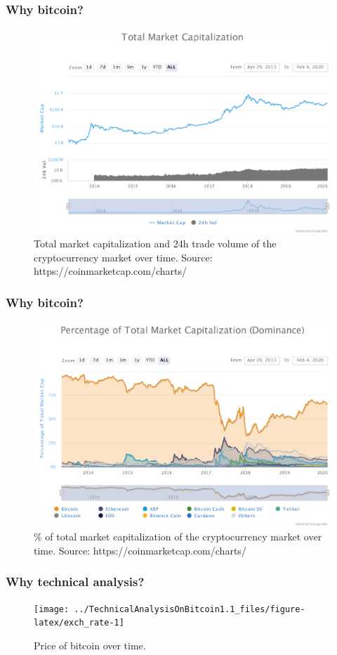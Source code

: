\documentclass[aspectratio=169]{beamer}
\newcommand*{\captionsource}[2]{%
	\caption[{#1}]{%
		#1%
		\hspace{\linewidth}%
		{\footnotesize {\color{ugentblue}Source:} #2}%
	}%
}
\begin{document}
\begin{frame}
	\frametitle{Why bitcoin?}
	\begin{figure}
		\centering
		\includegraphics[width=0.8\linewidth, height=0.8\textheight]{total-market-capitalizat.pdf}
		\captionsource{Total market capitalization and 24h trade volume of the cryptocurrency market over time.}{https://coinmarketcap.com/charts/}
		\label{fig:marketcap}
	\end{figure}
\end{frame}

\begin{frame}
\frametitle{Why bitcoin?}
\begin{figure}
	\centering
	\includegraphics[width=0.8\linewidth, height=0.8\textheight]{percentage-of-total-mark.pdf}
	\captionsource{\% of total market capitalization of the cryptocurrency market over time.}{https://coinmarketcap.com/charts/}
	\label{fig:percmarkcap}
\end{figure}
\end{frame}

\begin{frame}
\frametitle{Why technical analysis?}
\begin{figure}
	\centering
	\texttt{[image: ../TechnicalAnalysisOnBitcoin1.1\_files/figure-latex/exch\_rate-1]}
	\caption[Price of bitcoin over time.]{Price of bitcoin over time.}
	\label{fig:exchrate-1}
\end{figure}
\end{frame}
\end{document}
